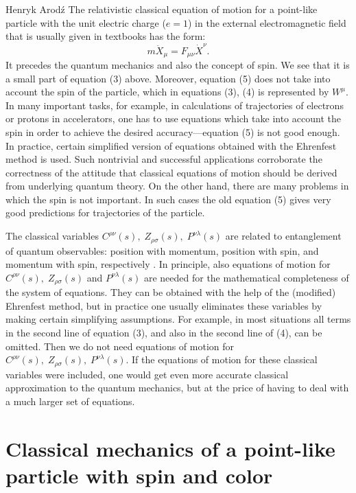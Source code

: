 \begin{artengenv}{Henryk Arod\'z}
The relativistic classical equation of motion for a point-like particle with the unit electric charge ($e=1$) in the external electromagnetic field that is usually given in textbooks has the form:
\begin{equation} m \ddot{X}_{\mu} = F_{\mu\nu}\dot{X}^{\nu}. \end{equation}
It precedes the quantum mechanics and also the concept of spin. We see that 
it is a small part of equation (3) above. Moreover, equation (5) does not take into account the spin of the particle, which in equations (3), (4) is represented by $W^{\mu}$. In many important tasks, for example, in calculations of trajectories of electrons or protons in accelerators, one has to use equations which take into account the spin in order to achieve the desired accuracy---equation (5) is not good enough. In practice, certain simplified version of equations obtained with the Ehrenfest method is used. Such nontrivial and successful applications corroborate the correctness of the attitude that classical equations of motion should be derived from underlying quantum theory. On the other hand, there are many problems in which the spin is not important. In such cases the old equation (5) gives very good predictions for trajectories of the particle. 






The classical variables $ C^{\rho\nu}(s), \;Z_{\rho\sigma}(s), \;P^{\nu\lambda}(s)$ are related to entanglement of quantum observables: position with momentum, position with spin, and momentum with spin, respectively \parencite{aro1}. In principle, also equations of motion for $ C^{\rho\nu}(s), \;Z_{\rho\sigma}(s)$ and $P^{\nu\lambda}(s)$ are needed for the mathematical completeness of the system of equations. They can be obtained with the help of the (modified) Ehrenfest method, but in practice one usually eliminates these variables by making certain simplifying assumptions. For example, in most situations all terms in the second line of equation (3), and also in the second line of (4), can be omitted. Then we do not need equations of motion for $ C^{\rho\nu}(s), \;Z_{\rho\sigma}(s), \;P^{\nu\lambda}(s)$. If the equations of motion for these classical variables were included, one would get even more accurate 
classical approximation to the quantum mechanics, but at the price of having to deal with a much larger set of equations. 



\section{Classical mechanics of a point-like particle with spin and color }



\end{artengenv}
